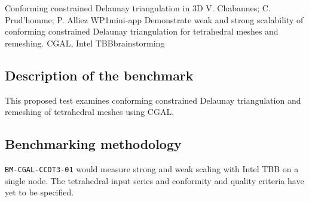 {Conforming constrained Delaunay triangulation in 3D}
{V. Chabannes; C. Prud'homme; P. Alliez}
{WP1}{mini-app}
{Demonstrate weak and strong scalability of conforming constrained Delaunay triangulation for tetrahedral meshes and remeshing.}
{CGAL, Intel TBB}{brainstorming}
\subsection{Description of the benchmark}
This proposed test examines conforming constrained Delaunay
triangulation and remeshing of tetrahedral meshes using CGAL.

\subsection{Benchmarking methodology}
\texttt{BM-CGAL-CCDT3-01} would measure strong and weak scaling with
Intel TBB on a single node. The tetrahedral input series and conformity
and quality criteria have yet to be specified.
